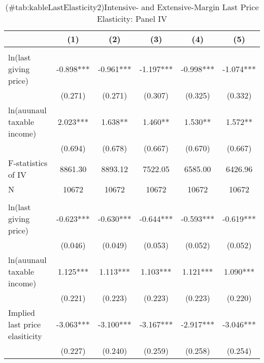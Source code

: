 \documentclass[
]{article}
\begin{document}
\begin{table}

\caption{(\#tab:kableLastElasticity2)Intensive- and Extensive-Margin Last Price Elasticity: Panel IV}
\centering
\fontsize{7}{9}\selectfont
\begin{threeparttable}
\begin{tabular}[t]{lccccc}
\toprule
 & (1) & (2) & (3) & (4) & (5)\\
\midrule
\addlinespace[0.3em]
\multicolumn{6}{l}{\textbf{Intensive-Margin Elasticity}}\\
\hspace{1em}ln(last giving price) & -0.898*** & -0.961*** & -1.197*** & -0.998*** & -1.074***\\
\hspace{1em} & (0.271) & (0.271) & (0.307) & (0.325) & (0.332)\\
\hspace{1em}ln(auunaul taxable income) & 2.023*** & 1.638** & 1.460** & 1.530** & 1.572**\\
\hspace{1em} & (0.694) & (0.678) & (0.667) & (0.670) & (0.667)\\
\hspace{1em}F-statistics of IV & 8861.30 & 8893.12 & 7522.05 & 6585.00 & 6426.96\\
\hspace{1em}N & 10672 & 10672 & 10672 & 10672 & 10672\\
\addlinespace[0.3em]
\multicolumn{6}{l}{\textbf{Extensive-Margin Elasticity}}\\
\hspace{1em}ln(last giving price) & -0.623*** & -0.630*** & -0.644*** & -0.593*** & -0.619***\\
\hspace{1em} & (0.046) & (0.049) & (0.053) & (0.052) & (0.052)\\
\hspace{1em}ln(auunaul taxable income) & 1.125*** & 1.113*** & 1.103*** & 1.121*** & 1.090***\\
\hspace{1em} & (0.221) & (0.223) & (0.223) & (0.223) & (0.220)\\
\hspace{1em}Implied last price elasiticity & -3.063*** & -3.100*** & -3.167*** & -2.917*** & -3.046***\\
\hspace{1em} & (0.227) & (0.240) & (0.259) & (0.258) & (0.254)\\

\end{tabular}
\end{threeparttable}
\end{table}
\end{document}
